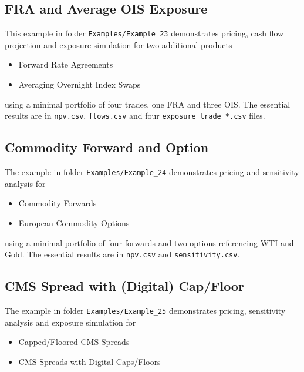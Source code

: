 \documentclass[12pt, a4paper]{article}
\begin{document}
{%
\subsection{FRA and Average OIS Exposure}%

This example in folder {\tt Examples/Example\_23} demonstrates pricing, cash flow projection and exposure simulation for two additional products
\begin{itemize}
\item Forward Rate Agreements
\item Averaging Overnight Index Swaps
\end{itemize}
using a minimal portfolio of four trades, one FRA and three OIS. The essential results are in {\tt npv.csv}, {\tt flows.csv} and 
four {\tt exposure\_trade\_*.csv} files.

\subsection{Commodity Forward and Option}%
\label{example:24}

The example in folder {\tt Examples/Example\_24} demonstrates pricing and sensitivity analysis for
\begin{itemize}
\item Commodity Forwards
\item European Commodity Options
\end{itemize}
using a minimal portfolio of four forwards and two options referencing WTI and Gold. 
The essential results are in {\tt npv.csv} and {\tt sensitivity.csv}.

\subsection{CMS Spread with (Digital) Cap/Floor}%
\label{example:25}

The example in folder {\tt Examples/Example\_25}  demonstrates pricing, sensitivity analysis 
and exposure simulation for 
\begin{itemize}
\item Capped/Floored CMS Spreads
\item CMS Spreads with Digital Caps/Floors
\end{itemize}

}
\end{document}
